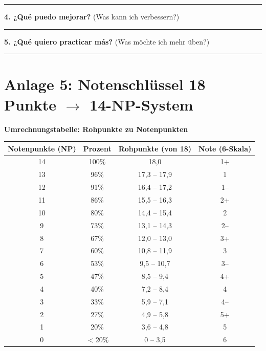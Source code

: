 \documentclass[11pt,a4paper]{article}
\begin{document}
\hrule

\vspace{1em}

\textbf{4. ¿Qué puedo mejorar?} (Was kann ich verbessern?)

\vspace{2cm}

\hrule

\vspace{1em}

\textbf{5. ¿Qué quiero practicar más?} (Was möchte ich mehr üben?)

\vspace{2cm}

\hrule

\newpage

\section*{Anlage 5: Notenschlüssel 18 Punkte $\rightarrow$ 14-NP-System}

\begin{center}
\textbf{\large Umrechnungstabelle: Rohpunkte zu Notenpunkten}
\end{center}

\vspace{1em}

\begin{tabular}{|c|c|c|c|}
\hline
\textbf{Notenpunkte (NP)} & \textbf{Prozent} & \textbf{Rohpunkte (von 18)} & \textbf{Note (6-Skala)} \\
\hline
\hline
14 & 100\% & 18,0 & 1+ \\
\hline
13 & 96\% & 17,3 -- 17,9 & 1 \\
\hline
12 & 91\% & 16,4 -- 17,2 & 1-- \\
\hline
\hline
11 & 86\% & 15,5 -- 16,3 & 2+ \\
\hline
10 & 80\% & 14,4 -- 15,4 & 2 \\
\hline
9 & 73\% & 13,1 -- 14,3 & 2-- \\
\hline
\hline
8 & 67\% & 12,0 -- 13,0 & 3+ \\
\hline
7 & 60\% & 10,8 -- 11,9 & 3 \\
\hline
6 & 53\% & 9,5 -- 10,7 & 3-- \\
\hline
\hline
5 & 47\% & 8,5 -- 9,4 & 4+ \\
\hline
4 & 40\% & 7,2 -- 8,4 & 4 \\
\hline
3 & 33\% & 5,9 -- 7,1 & 4-- \\
\hline
\hline
2 & 27\% & 4,9 -- 5,8 & 5+ \\
\hline
1 & 20\% & 3,6 -- 4,8 & 5 \\
\hline
0 & $<$20\% & 0 -- 3,5 & 6 \\
\hline
\end{tabular}
\end{document}
